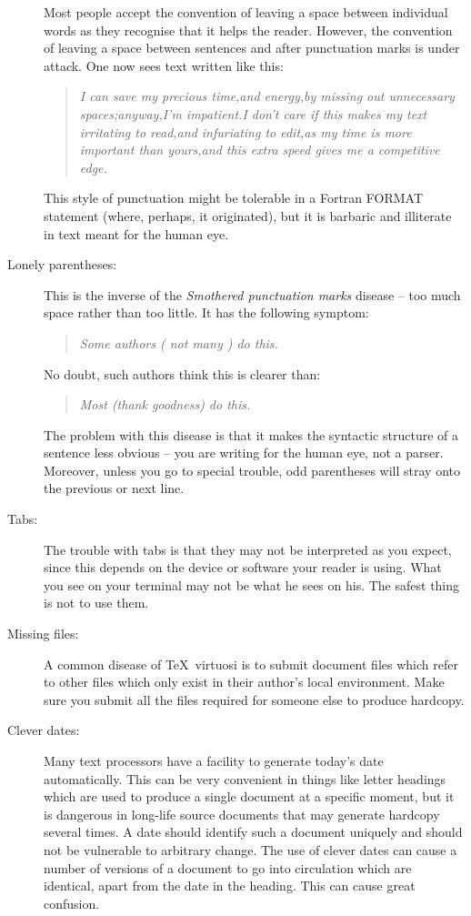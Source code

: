 \documentclass[twoside,11pt]{article}
\begin{document}
\begin{description}
Most people accept the convention of leaving a space between individual words
as they recognise that it helps the reader.
However, the convention of leaving a space between sentences and after
punctuation marks is under attack.
One now sees text written like this:
\begin{quote}
{\em I can save my precious time,and energy,by missing out unnecessary
spaces;anyway,I'm impatient.I don't care if this makes my text
irritating to read,and infuriating to edit,as my time is more important than
yours,and this extra speed gives me a competitive edge.}
\end{quote}
This style of punctuation might be tolerable in a Fortran FORMAT statement
(where, perhaps, it originated), but it is barbaric and illiterate in text
meant for the human eye.

\item [Lonely parentheses:]

This is the inverse of the {\em Smothered punctuation marks} disease\/ --
too much space rather than too little.
It has the following symptom:
\begin{quote}
{\em Some authors ( not many ) do this.}
\end{quote}
No doubt, such authors think this is clearer than:
\begin{quote}
{\em Most (thank goodness) do this.}
\end{quote}
The problem with this disease is that it makes the syntactic structure of a
sentence less obvious -- you are writing for the human eye, not a parser.
Moreover, unless you go to special trouble, odd parentheses will stray onto the
previous or next line.

\item [Tabs:]

The trouble with tabs is that they may not be interpreted as you expect, since
this depends on the device or software your reader is using.
What you see on your terminal may not be what he sees on his.
The safest thing is not to use them.

\item [Missing files:]

A common disease of \TeX\ virtuosi is to submit document files which refer to
other files which only exist in their author's local environment.
Make sure you submit all the files required for someone else to produce
hardcopy.

\item [Clever dates:]

Many text processors have a facility to generate today's date automatically.
This can be very convenient in things like letter headings which are used
to produce a single document at a specific moment, but it is dangerous in
long-life source documents that may generate hardcopy several times.
A date should identify such a document uniquely and should not be vulnerable to
arbitrary change.
The use of clever dates can cause a number of versions of a document to go
into circulation which are identical, apart from the date in the heading.
This can cause great confusion.

\end{description}
\end{document}
